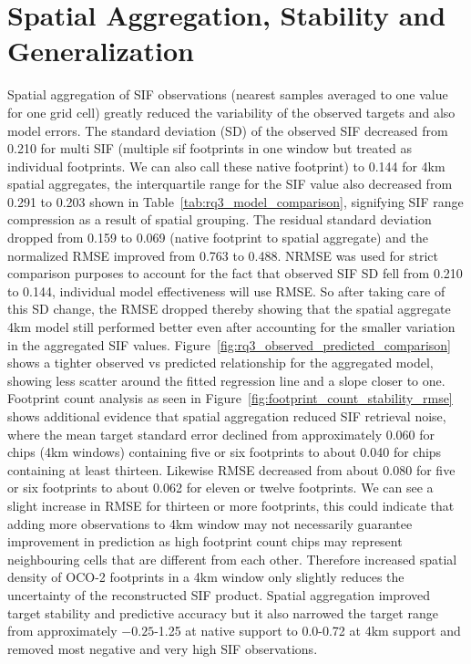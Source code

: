 \section{Spatial Aggregation, Stability and Generalization}

Spatial aggregation of SIF observations (nearest samples averaged to one value for one grid cell) greatly reduced the variability of the observed targets and also model errors. The standard deviation (SD) of the observed SIF decreased from 0.210 for multi SIF (multiple sif footprints in one window but treated as individual footprints. We can also call these native footprint) to 0.144 for 4km spatial aggregates, the interquartile range for the SIF value also decreased from 0.291 to 0.203 shown in Table~\ref{tab:rq3_model_comparison}, signifying SIF range compression as a result of spatial grouping. The residual standard deviation dropped from 0.159 to 0.069 (native footprint to spatial aggregate) and the normalized RMSE improved from 0.763 to 0.488. NRMSE was used for strict comparison purposes to account for the fact that observed SIF SD fell from 0.210 to 0.144, individual model effectiveness will use RMSE. So after taking care of this SD change, the RMSE dropped thereby showing that the spatial aggregate 4km model still performed better even after accounting for the smaller variation in the aggregated SIF values. Figure~\ref{fig:rq3_observed_predicted_comparison} shows a tighter observed vs predicted relationship for the aggregated model, showing less scatter around the fitted regression line and a slope closer to one. Footprint count analysis as seen in Figure~\ref{fig:footprint_count_stability_rmse} shows additional evidence that spatial aggregation reduced SIF retrieval noise, where the mean target standard error declined from approximately 0.060 for chips (4km windows) containing five or six footprints to about 0.040 for chips containing at least thirteen. Likewise RMSE decreased from about 0.080 for five or six footprints to about 0.062 for eleven or twelve footprints. We can see a slight increase in RMSE for thirteen or more footprints, this could indicate that adding more observations to 4km window may not necessarily guarantee improvement in prediction as high footprint count chips may represent neighbouring cells that are different from each other. Therefore increased spatial density of OCO-2 footprints in a 4km window only slightly reduces the uncertainty of the reconstructed SIF product. Spatial aggregation improved target stability and predictive accuracy but it also narrowed the target range from approximately $-0.25$-1.25 at native support to 0.0-0.72 at 4km support and removed most negative and very high SIF observations. 

